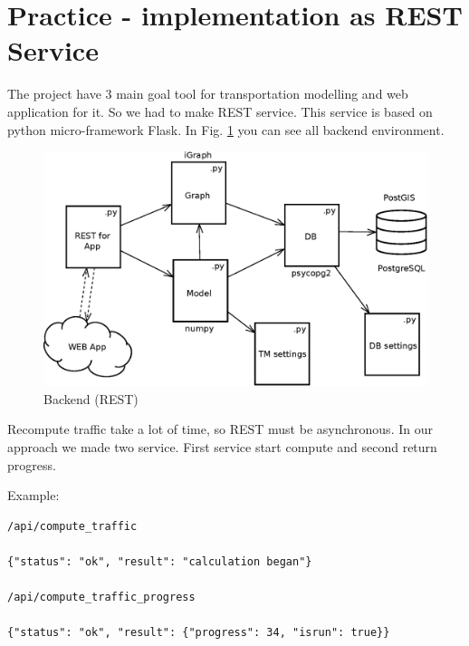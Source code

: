 \section{Practice - implementation as REST Service}
The project have 3 main goal tool for transportation modelling and web application for it. So we had to make REST service. This service is based on python micro-framework Flask. In Fig. \ref{img.b} you can see all backend environment.

\begin{figure}
\centering
\includegraphics[width=15cm]{img/c01-transp-model/backend.eps}
\caption{Backend (REST)}
\label{img.b}
\end{figure}

Recompute traffic take a lot of time, so REST must be asynchronous. In our approach we made two service. First service start compute and second return progress.

Example:
\begin{verbatim}
/api/compute_traffic

{"status": "ok", "result": "calculation began"}

/api/compute_traffic_progress

{"status": "ok", "result": {"progress": 34, "isrun": true}}
\end{verbatim}